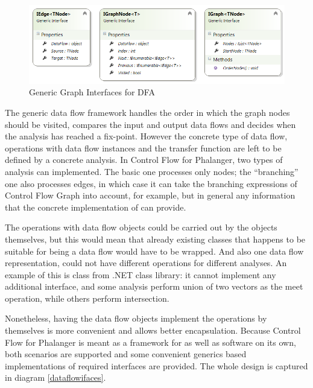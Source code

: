 \begin{figure}[h]  
  \centering
    \includegraphics*[width=\textwidth,height=\textheight,keepaspectratio]{img/graph-ifaces.png}  
    \caption{Generic Graph Interfaces for DFA\label{graphifaces}}
\end{figure}    

        The generic data flow framework handles the order in which the 
        graph nodes should be visited, compares the input and output 
        data flows and decides when the analysis has reached a fix-point. 
        However the concrete type of data flow, operations with data 
        flow instances and the transfer function are left to be defined 
        by a concrete analysis. In Control Flow for 
        Phalanger, two types of analysis can implemented. The basic one 
        processes only nodes; the ``branching'' one also processes edges, 
        in which case it can take the branching expressions of Control 
        Flow Graph into account, for example, but in general any information 
        that the concrete implementation of  can provide.
        
        The operations with data flow objects could be carried out by the 
        objects themselves, but this would mean that already existing 
        classes that happens to be suitable for being a data flow would 
        have to be wrapped. And also one data flow representation, could 
        not have different operations for different analyses. An example 
        of this is  class from .NET class library: it 
        cannot implement any additional interface, and some analysis 
        perform union of two vectors as the meet operation, while 
        others perform intersection.
        
        Nonetheless, having the data flow objects implement the operations by 
        themselves is more convenient and allows better encapsulation. 
        Because Control Flow for Phalanger is meant as a framework for as 
        well as software on its own, both scenarios are supported and 
        some convenient generics based implementations of required 
        interfaces are provided. The whole design is captured in 
        diagram \ref{dataflowifaces}.
        
